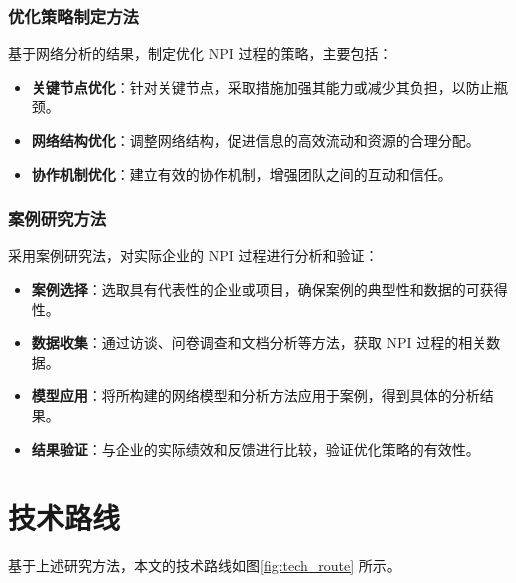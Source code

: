 \subsubsection{优化策略制定方法}

基于网络分析的结果，制定优化 NPI 过程的策略，主要包括：

\begin{itemize}
  \item \textbf{关键节点优化}：针对关键节点，采取措施加强其能力或减少其负担，以防止瓶颈\citep{guimera2005worldwide}。
  \item \textbf{网络结构优化}：调整网络结构，促进信息的高效流动和资源的合理分配\citep{cross2004hidden}。
  \item \textbf{协作机制优化}：建立有效的协作机制，增强团队之间的互动和信任\citep{reagans2003network}。
\end{itemize}

\subsubsection{案例研究方法}

采用案例研究法，对实际企业的 NPI 过程进行分析和验证：

\begin{itemize}
  \item \textbf{案例选择}：选取具有代表性的企业或项目，确保案例的典型性和数据的可获得性。
  \item \textbf{数据收集}：通过访谈、问卷调查和文档分析等方法，获取 NPI 过程的相关数据。
  \item \textbf{模型应用}：将所构建的网络模型和分析方法应用于案例，得到具体的分析结果。
  \item \textbf{结果验证}：与企业的实际绩效和反馈进行比较，验证优化策略的有效性。
\end{itemize}

\section{技术路线}

基于上述研究方法，本文的技术路线如图\ref{fig:tech_route} 所示。

